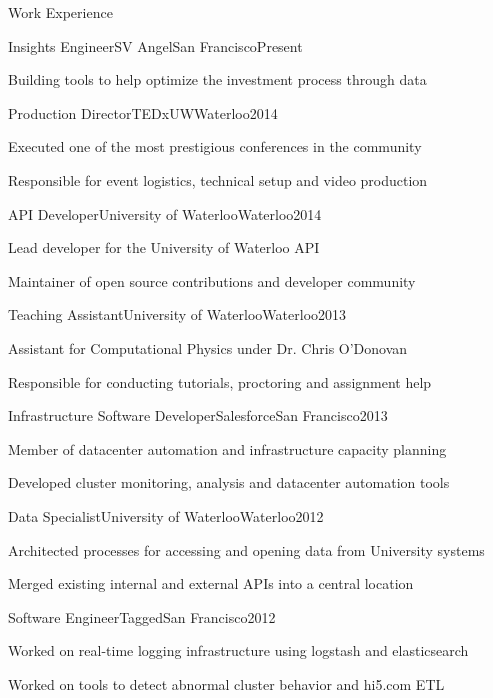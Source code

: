 \documentclass[oneside]{resume}
\begin{document}
  \begin{rSection}{Work Experience}

    \begin{rSubsection}{Insights Engineer}{SV Angel}{San Francisco}{Present}
      \item Building tools to help optimize the investment process through data
    \end{rSubsection}

    \begin{rSubsection}{Production Director}{TEDxUW}{Waterloo}{2014}
      \item Executed one of the most prestigious conferences in the community
      \item Responsible for event logistics, technical setup and video production
    \end{rSubsection}

    \begin{rSubsection}{API Developer}{University of Waterloo}{Waterloo}{2014}
      \item Lead developer for the University of Waterloo API
      \item Maintainer of open source contributions and developer community
    \end{rSubsection}

    \begin{rSubsection}{Teaching Assistant}{University of Waterloo}{Waterloo}{2013}
      \item Assistant for Computational Physics under Dr. Chris O'Donovan
      \item Responsible for conducting tutorials, proctoring and assignment help
    \end{rSubsection}

    \begin{rSubsection}{Infrastructure Software Developer}{Salesforce}{San Francisco}{2013}
      \item Member of datacenter automation and infrastructure capacity planning
      \item Developed cluster monitoring, analysis and datacenter automation tools
    \end{rSubsection}

    \begin{rSubsection}{Data Specialist}{University of Waterloo}{Waterloo}{2012}
      \item Architected processes for accessing and opening data from University systems
      \item Merged existing internal and external APIs into a central location
    \end{rSubsection}

    \begin{rSubsection}{Software Engineer}{Tagged}{San Francisco}{2012}
      \item Worked on real-time logging infrastructure using logstash and elasticsearch
      \item Worked on tools to detect abnormal cluster behavior and hi5.com ETL
    \end{rSubsection}

  \end{rSection}
\end{document}
